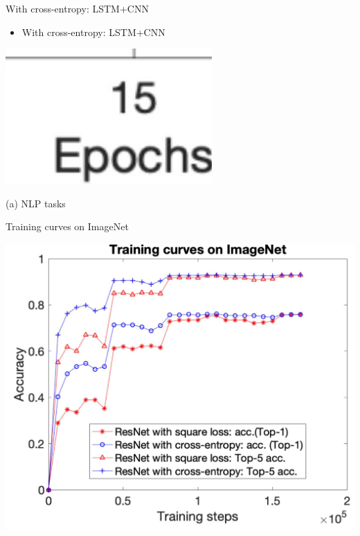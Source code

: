 \documentclass[10pt]{article}
\begin{document}
With cross-entropy: LSTM+CNN

\begin{itemize}
  \item With cross-entropy: LSTM+CNN
\end{itemize}

\begin{center}
\includegraphics[max width=\textwidth]{2023_12_30_cf784c471dfd1dd5afbag-36(1)}
\end{center}

(a) NLP tasks

Training curves on ImageNet

\begin{center}
\includegraphics[max width=\textwidth]{2023_12_30_cf784c471dfd1dd5afbag-36}
\end{center}
\end{document}
